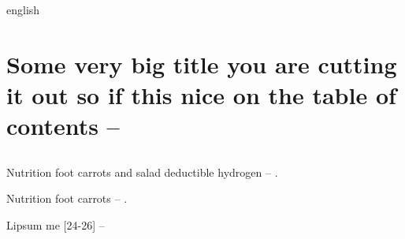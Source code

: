 

\begin{otherlanguage*}{english}

    \chapter
     [Some very big title -- \showfont]
     {Some very big title you are cutting it out so if this nice on the table of contents -- \showfont}

    \begin{flushright}
        \englishword{\showfont}
    \end{flushright}

    \section[Some encoding tests -- \showfont]{\showfont}

    Nutrition foot carrots and salad deductible hydrogen -- \showfont.

    Nutrition foot carrots -- \showfont.

    \englishword{\showfont}

    Lipsum me [24-26] -- \showfont

    \newpage

\end{otherlanguage*}

